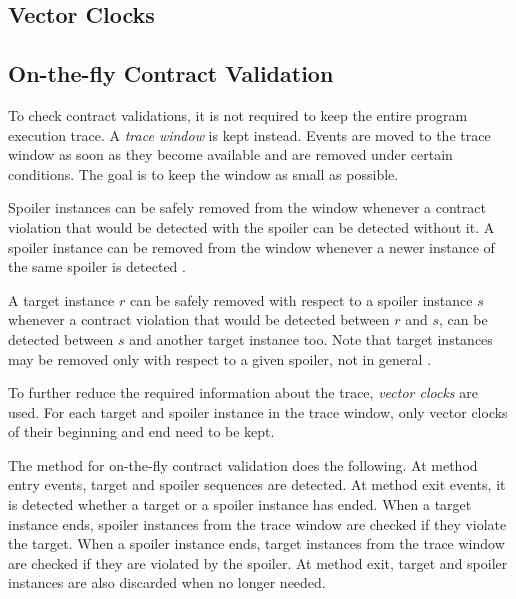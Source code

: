{\color{blue}\lipsum[2]}

\subsection{Vector Clocks}

{\color{blue}\lipsum[1-3]}

\subsection{On-the-fly Contract Validation}

To check contract validations, it is not required to keep the entire program
execution trace. A \emph{trace window} is kept instead. Events are moved to the
trace window as soon as they become available and are removed under certain
conditions. The goal is to keep the window as small as possible.

Spoiler instances can be safely removed from the window whenever a contract
violation that would be detected with the spoiler can be detected without it. A
spoiler instance can be removed from the window whenever a newer instance of the
same spoiler is detected \cite{contracts}.

A target instance $r$ can be safely removed with respect to a spoiler instance
$s$ whenever a contract violation that would be detected between $r$ and $s$,
can be detected between $s$ and another target instance too. Note that target
instances may be removed only with respect to a given spoiler, not in general
\cite{contracts}.

To further reduce the required information about the trace, \emph{vector clocks}
are used. For each target and spoiler instance in the trace window, only vector
clocks of their beginning and end need to be kept.

The method for on-the-fly contract validation does the following. At method
entry events, target and spoiler sequences are detected. At method exit events,
it is detected whether a target or a spoiler instance has ended. When a target
instance ends, spoiler instances from the trace window are checked if they
violate the target. When a spoiler instance ends, target instances from the
trace window are checked if they are violated by the spoiler. At method exit,
target and spoiler instances are also discarded when no longer needed.

{\color{blue}\lipsum[1-3]}

